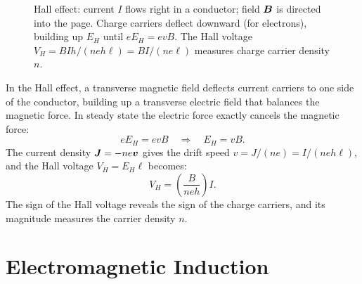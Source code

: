 \begin{figure}[H]
\begin{center}
\end{center}
\caption{Hall effect: current $I$ flows right in a conductor; field $\vect{B}$ is directed into the page. Charge carriers deflect downward (for electrons), building up $E_H$ until $eE_H = evB$. The Hall voltage $V_H = BIh/(neh\ell) = BI/(ne\ell)$ measures charge carrier density $n$.}
\end{figure}

In the Hall effect, a transverse magnetic field deflects current carriers to one side of the conductor, building up a transverse electric field that balances the magnetic force. In steady state the electric force exactly cancels the magnetic force:
\[
    eE_H = ev B \quad \Rightarrow \quad E_H = vB.
\]
The current density $\vect{J} = -ne\lvect{v}$ gives the drift speed $v = J/(ne) = I/(neh\ell)$, and the Hall voltage $V_H = E_H \ell$ becomes:
\[
    V_H = \left(\frac{B}{neh}\right) I.
\]
The sign of the Hall voltage reveals the sign of the charge carriers, and its magnitude measures the carrier density $n$.


\chapter{Electromagnetic Induction}

